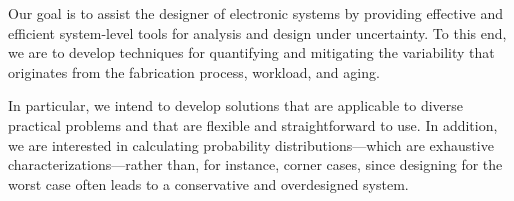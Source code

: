 Our goal is to assist the designer of electronic systems by providing effective
and efficient system-level tools for analysis and design under uncertainty. To
this end, we are to develop techniques for quantifying and mitigating the
variability that originates from the fabrication process, workload, and aging.

In particular, we intend to develop solutions that are applicable to diverse
practical problems and that are flexible and straightforward to use. In
addition, we are interested in calculating probability distributions---which are
exhaustive characterizations---rather than, for instance, corner cases, since
designing for the worst case often leads to a conservative and overdesigned
system.
